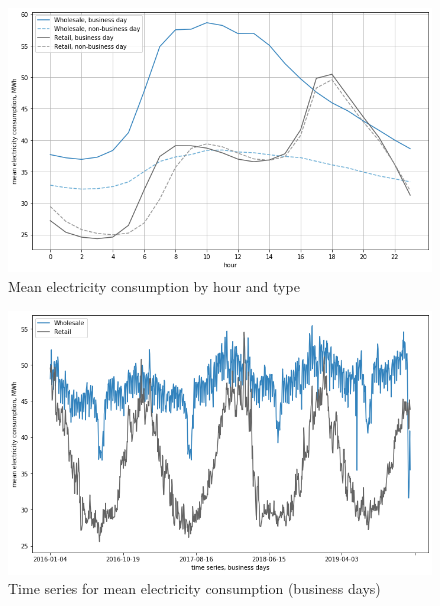 \begin{figure}[H]
  \centering
  \caption{Mean electricity consumption by hour and type}
    \label{fig:cons_hours}
  \includegraphics[width=1 \textwidth]{03_figures/cons_hours}
\end{figure}

\begin{figure}[H]
  \centering
  \caption{Time series for mean electricity consumption (business days)}
  \label{fig:cons_time_series}
  \includegraphics[width=1 \textwidth]{03_figures/cons_time series, business days}
\end{figure}

